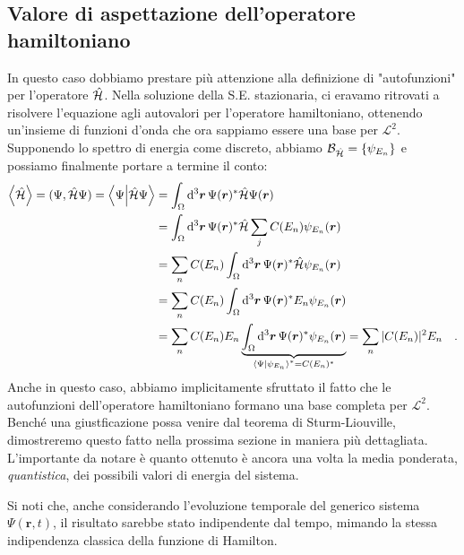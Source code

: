 \subsection{Valore di aspettazione dell'operatore hamiltoniano}
In questo caso dobbiamo prestare più attenzione alla definizione di "autofunzioni" per l'operatore $\hat{\mathcal{H}}$. Nella soluzione della S.E. stazionaria, ci eravamo ritrovati a risolvere l'equazione agli autovalori per l'operatore hamiltoniano, ottenendo un'insieme di funzioni d'onda che ora sappiamo essere una base per $\mathcal{L}^2$. Supponendo lo spettro di energia come discreto, abbiamo $\mathcal{B}_{\hat{\mathcal{H}}} = \{ \psi_{E_n} \}$ e possiamo finalmente portare a termine il conto:
\[
    \begin{aligned}
        \left\langle \hat{\mathcal{H}} \right\rangle = (\Psi, \hat{\mathcal{H}} \Psi) = \braket{\Psi}{\hat{\mathcal{H}}\Psi} &= \int_\Omega \dd^3{\bm{r}} \, \Psi(\bm{r})^*\hat{\mathcal{H}}\Psi(\bm{r}) \\
        &= \int_\Omega \dd^3{\bm{r}} \, \Psi(\bm{r})^* \hat{\mathcal{H}} \sum_j C(E_n) \psi_{E_n}(\bm{r}) \\
        &= \sum_n C(E_n)\int_\Omega \dd^3{\bm{r}} \, \Psi(\bm{r})^* \hat{\mathcal{H}} \psi_{E_n}(\bm{r}) \\
        &= \sum_n C(E_n)\int_\Omega \dd^3{\bm{r}} \, \Psi(\bm{r})^* E_n \psi_{E_n}(\bm{r}) \\
        &= \sum_nC(E_n) E_n \underbrace{\int_\Omega \dd^3{\bm{r}} \, \Psi(\bm{r})^* \psi_{E_n}(\bm{r})}_{\braket{\Psi}{\psi_{E_n}}^* = C(E_n)^*} = \sum_n|C(E_n)|^2 E_n \quad.
    \end{aligned}
\]
Anche in questo caso, abbiamo implicitamente sfruttato il fatto che le autofunzioni dell'operatore hamiltoniano formano una base completa per $\mathcal{L}^2$. Benché una giustficazione possa venire dal teorema di Sturm-Liouville, dimostreremo questo fatto nella prossima sezione in maniera più dettagliata. L'importante da notare è quanto ottenuto è ancora una volta la media ponderata, \emph{quantistica}, dei possibili valori di energia del sistema. 

Si noti che, anche considerando l'evoluzione temporale del generico sistema $\Psi (\bm{r},t)$, il risultato sarebbe stato indipendente dal tempo, mimando la stessa indipendenza classica della funzione di Hamilton.